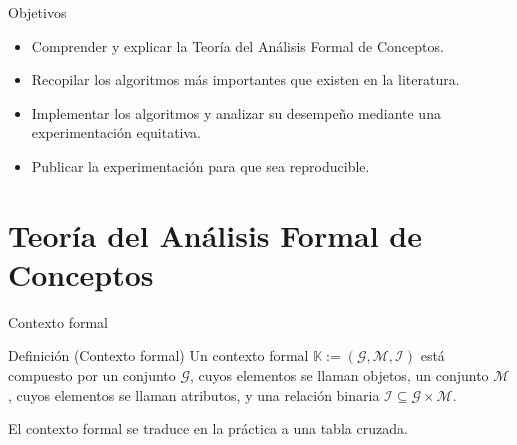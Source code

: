 \documentclass{beamer}
\newcommand{\M}{\mathcal{M}}
\newcommand{\I}{\mathcal{I}}
\newcommand{\G}{\mathcal{G}}
\begin{document}
  \begin{frame}{Objetivos}
      \begin{itemize}
          \item Comprender y explicar la Teoría del Análisis Formal de Conceptos.
          \vspace{4mm}
          \item Recopilar los algoritmos más importantes que existen en la literatura.
          \vspace{4mm}
          \item Implementar los algoritmos y analizar su desempeño mediante una experimentación equitativa.
          \vspace{4mm}
          \item Publicar la experimentación para que sea reproducible.
      \end{itemize}
  \end{frame}



\section{Teoría del Análisis Formal de Conceptos}
\begin{frame}{Contexto formal}
    \begin{block}{Definición (Contexto formal)} 
    \justifying
    Un contexto formal $\mathbb{K}:=(\G,\M,\I)$ está compuesto por un conjunto $\G$, cuyos elementos se llaman objetos, un conjunto $\M$, cuyos elementos se llaman atributos, y una relación binaria $\I \subseteq \G \times \M$. 

    \end{block}
  
     \vspace{6mm}
     \pause

      El contexto formal se traduce en la práctica a una tabla cruzada.
\end{frame}
\end{document}
